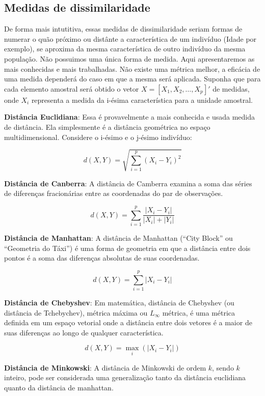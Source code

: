 \documentclass[
  letterpaper,
  DIV=11,
  numbers=noendperiod]{scrreprt}
\begin{document}
\hypertarget{medidas-de-dissimilaridade}{%
\subsection{Medidas de
dissimilaridade}\label{medidas-de-dissimilaridade}}

De forma mais intutitiva, essas medidas de dissimilaridade seriam formas
de numerar o quão próximo ou distânte a característica de um indivíduo
(Idade por exemplo), se aproxima da mesma característica de outro
indivíduo da mesma população. Não possuimos uma única forma de medida.
Aqui apresentaremos as mais conhecidas e mais trabalhadas. Não existe
uma métrica melhor, a eficácia de uma medida dependerá do caso em que a
mesma será aplicada. Suponha que para cada elemento amostral será obtido
o vetor \(X = [X_{1},X_{2},\dots,X_{p}]'\) de medidas, onde \(X_{i}\)
representa a medida da i-ésima característica para a unidade amostral.

\textbf{Distância Euclidiana}: Essa é provavelmente a mais conhecida e
usada medida de distância. Ela simplesmente é a distância geométrica no
espaço multidimensional. Considere o i-ésimo e o j-ésimo indivíduo:

\[
d(X,Y) = \sqrt{\sum^p_{i=1}(X_i - Y_i)^2}
\]

\textbf{Distância de Canberra}: A distância de Camberra examina a soma
das séries de diferenças fracionárias entre as coordenadas do par de
observações.

\[
d(X,Y) = \sum^p_{i=1}\frac{|X_i - Y_i|}{|X_i| + |Y_i|}
\]

\textbf{Distância de Manhattan}: A distância de Manhattan (``City
Block'' ou ``Geometria do Táxi'') é uma forma de geometria em que a
distância entre dois pontos é a soma das diferenças absolutas de suas
coordenadas.

\[
d(X,Y) = \sum^p_{i=1}|X_i- Y_i|
\]

\textbf{Distância de Chebyshev}: Em matemática, distância de Chebyshev
(ou distância de Tchebychev), métrica máxima ou \(L_{\infty}\) métrica,
é uma métrica definida em um espaço vetorial onde a distância entre dois
vetores é a maior de suas diferenças ao longo de qualquer
característica.

\[
d(X,Y) = \max_i(|X_i - Y_i|)
\]

\textbf{Distância de Minkowski}: A distância de Minkowski de ordem
\(k\), sendo \(k\) inteiro, pode ser considerada uma generalização tanto
da distância euclidiana quanto da distância de manhattan.
\end{document}

